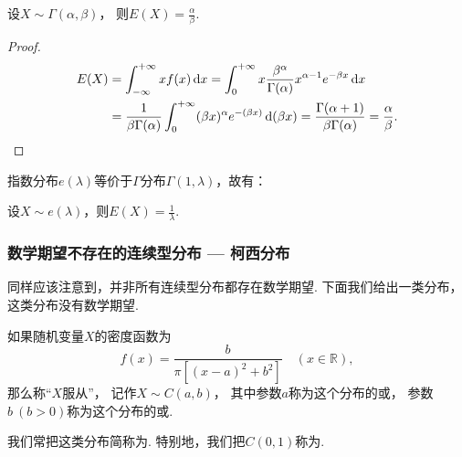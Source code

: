\begin{theorem}\label{theorem:随机变量的数字特征.伽马分布的数学期望}
设\(X \sim \Gamma(\alpha,\beta)\)，
则\(E(X)=\frac{\alpha}{\beta}\).
\begin{proof}
\begin{align*}
E(X)
&= \int_{-\infty}^{+\infty} x f(x) \dd{x}
= \int_0^{+\infty} x \frac{\beta^\alpha}{\Gamma(\alpha)} x^{\alpha-1} e^{-\beta x} \dd{x} \\
&= \frac{1}{\beta \Gamma(\alpha)} \int_0^{+\infty} (\beta x)^\alpha e^{-(\beta x)} \dd(\beta x)
= \frac{\Gamma(\alpha + 1)}{\beta \Gamma(\alpha)}
= \frac{\alpha}{\beta}.
\qedhere
\end{align*}
\end{proof}
\end{theorem}

指数分布\(e(\lambda)\)等价于\(\Gamma\)分布\(\Gamma(1,\lambda)\)，故有：
\begin{theorem}\label{theorem:随机变量的数字特征.指数分布的数学期望}
设\(X \sim e(\lambda)\)，则\(E(X) = \frac{1}{\lambda}\).
\end{theorem}

\subsubsection{数学期望不存在的连续型分布 --- 柯西分布}
同样应该注意到，并非所有连续型分布都存在数学期望.
下面我们给出一类分布，这类分布没有数学期望.

\begin{definition}
如果随机变量\(X\)的密度函数为\[
	f(x) = \frac{b}{\pi[(x-a)^2+b^2]}
	\quad(x\in\mathbb{R}),
\]
那么称“\(X\)服从”，
记作\(X \sim C(a,b)\)，
其中参数\(a\)称为这个分布的或，
参数\(b\ (b>0)\)称为这个分布的或.

我们常把这类分布简称为.
特别地，我们把\(C(0,1)\)称为.
\end{definition}

